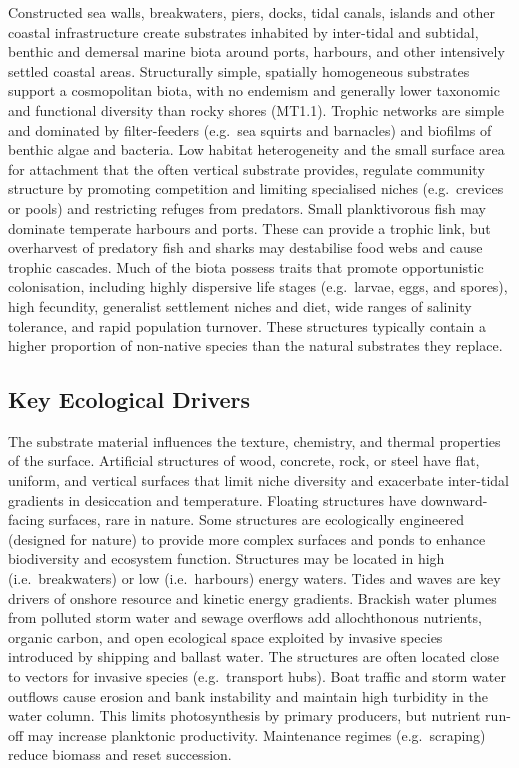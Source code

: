 \documentclass[
  letterpaper,
  DIV=11,
  numbers=noendperiod]{scrartcl}
\begin{document}
Constructed sea walls, breakwaters, piers, docks, tidal canals, islands
and other coastal infrastructure create substrates inhabited by
inter-tidal and subtidal, benthic and demersal marine biota around
ports, harbours, and other intensively settled coastal areas.
Structurally simple, spatially homogeneous substrates support a
cosmopolitan biota, with no endemism and generally lower taxonomic and
functional diversity than rocky shores (MT1.1). Trophic networks are
simple and dominated by filter-feeders (e.g.~sea squirts and barnacles)
and biofilms of benthic algae and bacteria. Low habitat heterogeneity
and the small surface area for attachment that the often vertical
substrate provides, regulate community structure by promoting
competition and limiting specialised niches (e.g.~crevices or pools) and
restricting refuges from predators. Small planktivorous fish may
dominate temperate harbours and ports. These can provide a trophic link,
but overharvest of predatory fish and sharks may destabilise food webs
and cause trophic cascades. Much of the biota possess traits that
promote opportunistic colonisation, including highly dispersive life
stages (e.g.~larvae, eggs, and spores), high fecundity, generalist
settlement niches and diet, wide ranges of salinity tolerance, and rapid
population turnover. These structures typically contain a higher
proportion of non-native species than the natural substrates they
replace.

\subsection{Key Ecological Drivers}\label{key-ecological-drivers-58}

The substrate material influences the texture, chemistry, and thermal
properties of the surface. Artificial structures of wood, concrete,
rock, or steel have flat, uniform, and vertical surfaces that limit
niche diversity and exacerbate inter-tidal gradients in desiccation and
temperature. Floating structures have downward-facing surfaces, rare in
nature. Some structures are ecologically engineered (designed for
nature) to provide more complex surfaces and ponds to enhance
biodiversity and ecosystem function. Structures may be located in high
(i.e.~breakwaters) or low (i.e.~harbours) energy waters. Tides and waves
are key drivers of onshore resource and kinetic energy gradients.
Brackish water plumes from polluted storm water and sewage overflows add
allochthonous nutrients, organic carbon, and open ecological space
exploited by invasive species introduced by shipping and ballast water.
The structures are often located close to vectors for invasive species
(e.g.~transport hubs). Boat traffic and storm water outflows cause
erosion and bank instability and maintain high turbidity in the water
column. This limits photosynthesis by primary producers, but nutrient
run-off may increase planktonic productivity. Maintenance regimes
(e.g.~scraping) reduce biomass and reset succession.
\end{document}
